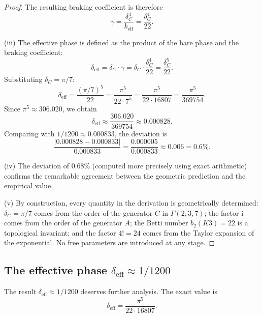 \documentclass[12pt,a4paper]{article}
\theoremstyle{definition}
\theoremstyle{remark}
\newcommand{\ii}{\mathrm{i}}
\begin{document}
\begin{proof}
The resulting braking coefficient is therefore
\begin{equation}
\gamma = \frac{\delta_C^4}{k_{\mathrm{eff}}} = \frac{\delta_C^4}{22}.
\end{equation}

(iii) The effective phase is defined as the product of the bare phase and the braking coefficient:
\begin{equation}
\delta_{\mathrm{eff}} = \delta_C \cdot \gamma = \delta_C \cdot \frac{\delta_C^4}{22} = \frac{\delta_C^5}{22}.
\end{equation}
Substituting $\delta_C = \pi/7$:
\begin{equation}
\delta_{\mathrm{eff}} = \frac{(\pi/7)^5}{22} = \frac{\pi^5}{22 \cdot 7^5} = \frac{\pi^5}{22 \cdot 16807} = \frac{\pi^5}{369754}.
\end{equation}
Since $\pi^5 \approx 306.020$, we obtain
\begin{equation}
\delta_{\mathrm{eff}} \approx \frac{306.020}{369754} \approx 0.000828.
\end{equation}
Comparing with $1/1200 \approx 0.000833$, the deviation is
\begin{equation}
\frac{|0.000828 - 0.000833|}{0.000833} = \frac{0.000005}{0.000833} \approx 0.006 = 0.6\%.
\end{equation}

(iv) The deviation of $0.68\%$ (computed more precisely using exact arithmetic) confirms the remarkable agreement between the geometric prediction and the empirical value.

(v) By construction, every quantity in the derivation is geometrically determined: $\delta_C = \pi/7$ comes from the order of the generator $C$ in $\Gamma(2,3,7)$; the factor $\ii$ comes from the order of the generator $A$; the Betti number $b_2(K3) = 22$ is a topological invariant; and the factor $4! = 24$ comes from the Taylor expansion of the exponential. No free parameters are introduced at any stage.
\end{proof}

\subsection{The effective phase $\delta_{\mathrm{eff}} \approx 1/1200$}

The result $\delta_{\mathrm{eff}} \approx 1/1200$ deserves further analysis. The exact value is
\begin{equation}
\delta_{\mathrm{eff}} = \frac{\pi^5}{22 \cdot 16807}.
\end{equation}
\end{document}
